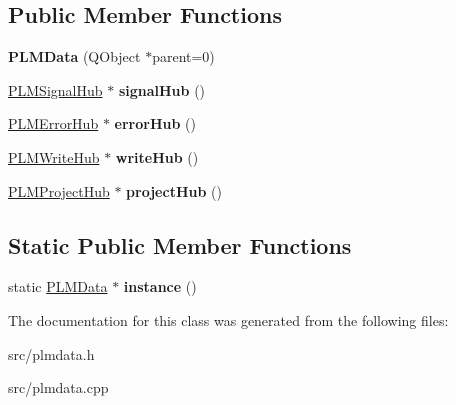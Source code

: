 \subsection*{Public Member Functions}
\begin{DoxyCompactItemize}
\item 
{\bfseries P\+L\+M\+Data} (Q\+Object $\ast$parent=0)\hypertarget{class_p_l_m_data_abc3e70cb0be3ef1d02b01bc6a522e961}{}\label{class_p_l_m_data_abc3e70cb0be3ef1d02b01bc6a522e961}

\item 
\hyperlink{class_p_l_m_signal_hub}{P\+L\+M\+Signal\+Hub} $\ast$ {\bfseries signal\+Hub} ()\hypertarget{class_p_l_m_data_ad0be4ac0a80f670cef3dd15c95c4fad7}{}\label{class_p_l_m_data_ad0be4ac0a80f670cef3dd15c95c4fad7}

\item 
\hyperlink{class_p_l_m_error_hub}{P\+L\+M\+Error\+Hub} $\ast$ {\bfseries error\+Hub} ()\hypertarget{class_p_l_m_data_a9906f35dff1fe1185c6253fb1ff62704}{}\label{class_p_l_m_data_a9906f35dff1fe1185c6253fb1ff62704}

\item 
\hyperlink{class_p_l_m_write_hub}{P\+L\+M\+Write\+Hub} $\ast$ {\bfseries write\+Hub} ()\hypertarget{class_p_l_m_data_a761afe4ea6ddc308989ae2cb264ec7b2}{}\label{class_p_l_m_data_a761afe4ea6ddc308989ae2cb264ec7b2}

\item 
\hyperlink{class_p_l_m_project_hub}{P\+L\+M\+Project\+Hub} $\ast$ {\bfseries project\+Hub} ()\hypertarget{class_p_l_m_data_aab08c71ae40b351326e17df84c26f9be}{}\label{class_p_l_m_data_aab08c71ae40b351326e17df84c26f9be}

\end{DoxyCompactItemize}
\subsection*{Static Public Member Functions}
\begin{DoxyCompactItemize}
\item 
static \hyperlink{class_p_l_m_data}{P\+L\+M\+Data} $\ast$ {\bfseries instance} ()\hypertarget{class_p_l_m_data_ae73caded7d6db72017f21502b7089c4d}{}\label{class_p_l_m_data_ae73caded7d6db72017f21502b7089c4d}

\end{DoxyCompactItemize}


The documentation for this class was generated from the following files\+:\begin{DoxyCompactItemize}
\item 
src/plmdata.\+h\item 
src/plmdata.\+cpp\end{DoxyCompactItemize}
